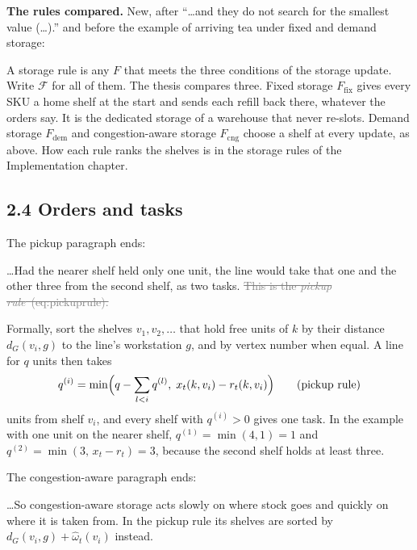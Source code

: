 \documentclass[11pt,a4paper]{article}
\newcommand{\new}[1]{\textcolor{newc}{#1}}
\newcommand{\old}[1]{\textcolor{gray}{\sout{#1}}}
\newenvironment{greenblock}{\color{newc}}{}
\begin{document}
\textbf{The rules compared.} New, after ``\dots and they do not search for the
smallest value (\dots).'' and before the example of arriving tea under fixed and demand storage:

\begin{greenblock}
A storage rule is any $F$ that meets the three conditions of the storage
update. Write $\mathcal{F}$ for all of them. The thesis compares three.
Fixed storage $F_{\mathrm{fix}}$ gives every SKU a home shelf at the start
and sends each refill back there, whatever the orders say. It is the
dedicated storage of a warehouse that never re-slots. Demand storage
$F_{\mathrm{dem}}$ and congestion-aware storage $F_{\mathrm{cng}}$ choose a
shelf at every update, as above. How each rule ranks the shelves is in
the storage rules of the Implementation chapter.
\end{greenblock}

\subsection*{2.4 Orders and tasks}

The pickup paragraph ends:

\dots Had the nearer shelf held only one unit, the line would take that one
and the other three from the second shelf, as two tasks. \old{This is the
\emph{pickup rule}~(eq:pickuprule).}

\begin{greenblock}
Formally, sort the shelves $v_1, v_2,\dots$ that hold free units of $k$ by
their distance $d_G(v_i,g)$ to the line's workstation $g$, and by vertex
number when equal. A line for $q$ units then takes
\[
  q^{(i)} = \min\Bigl(q - \sum_{l < i} q^{(l)},\; x_t(k, v_i) - r_t(k, v_i)\Bigr)
  \tag{pickup rule}
\]
units from shelf $v_i$, and every shelf with $q^{(i)}>0$ gives one task. In
the example with one unit on the nearer shelf, $q^{(1)}=\min(4,1)=1$ and
$q^{(2)}=\min(3,\,x_t-r_t)=3$, because the second shelf holds at least three.
\end{greenblock}

The congestion-aware paragraph ends:

\dots So congestion-aware storage acts slowly on where stock goes and quickly
on where it is taken from. \new{In the pickup rule its shelves are sorted by
$d_G(v_i,g)+\hat\omega_t(v_i)$ instead.}

\end{document}
